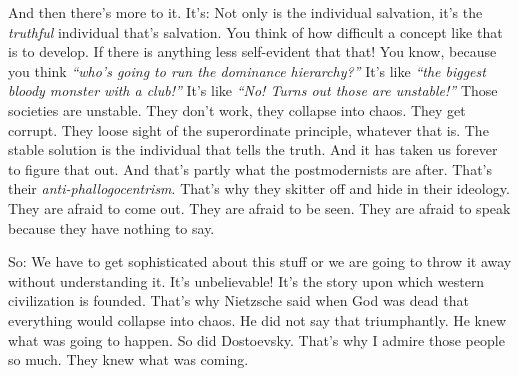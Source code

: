 \documentclass{memoir}
\newcommand{\qq}[1]{\emph{“#1”}}
\begin{document}
\begin{drama}
And then there’s more to it. It’s: Not only is the individual salvation, it’s the \emph{truthful} individual that’s salvation. You think of how difficult a concept like that is to develop. If there is anything less self-evident that that! You know, because you think \qq{who’s going to run the dominance hierarchy?} It’s like \qq{the biggest bloody monster with a club!} It’s like \qq{No! Turns out those are unstable!} Those societies are unstable. They don’t work, they collapse into chaos. They get corrupt. They loose sight of the superordinate principle, whatever that is. The stable solution is the individual that tells the truth. And it has taken us forever to figure that out. And that’s partly what the postmodernists are after. That’s their \emph{anti-phallogocentrism}. That’s why they skitter off and hide in their ideology. They are afraid to come out. They are afraid to be seen. They are afraid to speak because they have nothing to say.

So: We have to get sophisticated about this stuff or we are going to throw it away without understanding it. It’s unbelievable! It’s the story upon which western civilization is founded. That’s why Nietzsche said when God was dead that everything would collapse into chaos. He did not say that triumphantly. He knew what was going to happen. So did Dostoevsky. That’s why I admire those people so much. They knew what was coming.


\end{drama}
\end{document}
